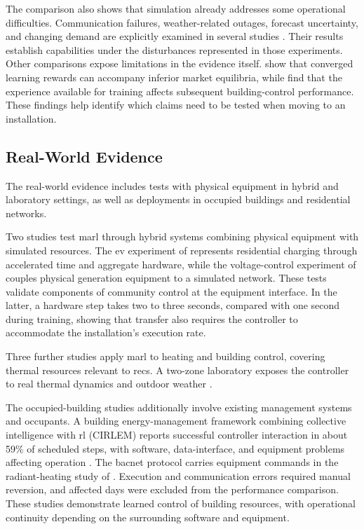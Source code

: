The comparison also shows that simulation already addresses some operational difficulties. Communication failures, weather-related outages, forecast uncertainty, and changing demand are explicitly examined in several studies \parencite{recC24,recC16,recN02,recC22}. Their results establish capabilities under the disturbances represented in those experiments. Other comparisons expose limitations in the evidence itself. \textcite{recN03} show that converged learning rewards can accompany inferior market equilibria, while \textcite{nweye2022realworld} find that the experience available for training affects subsequent building-control performance. These findings help identify which claims need to be tested when moving to an installation.


\subsection{Real-World Evidence}
\label{sec:ch3-physical-deployment}

The real-world evidence includes tests with physical equipment in hybrid and laboratory settings, as well as deployments in occupied buildings and residential networks.

Two studies test \gls{marl} through hybrid systems combining physical equipment with simulated resources. The \gls{ev} experiment of \textcite{recP07} represents residential charging through accelerated time and aggregate hardware, while the voltage-control experiment of \textcite{recP08} couples physical generation equipment to a simulated network. These tests validate components of community control at the equipment interface. In the latter, a hardware step takes two to three seconds, compared with one second during training, showing that transfer also requires the controller to accommodate the installation's execution rate.

Three further studies apply \gls{marl} to heating and building control, covering thermal resources relevant to \glspl{rec}. A two-zone laboratory exposes the controller to real thermal dynamics and outdoor weather \parencite{blad2023laboratory}.

The occupied-building studies additionally involve existing management systems and occupants. A building energy-management framework combining collective intelligence with \gls{rl} (CIRLEM) reports successful controller interaction in about 59\% of scheduled steps, with software, data-interface, and equipment problems affecting operation \parencite{hosseini2026cirlem}. The \gls{bacnet} protocol carries equipment commands in the radiant-heating study of \textcite{wang2026buildingmarl}. Execution and communication errors required manual reversion, and affected days were excluded from the performance comparison. These studies demonstrate learned control of building resources, with operational continuity depending on the surrounding software and equipment.

